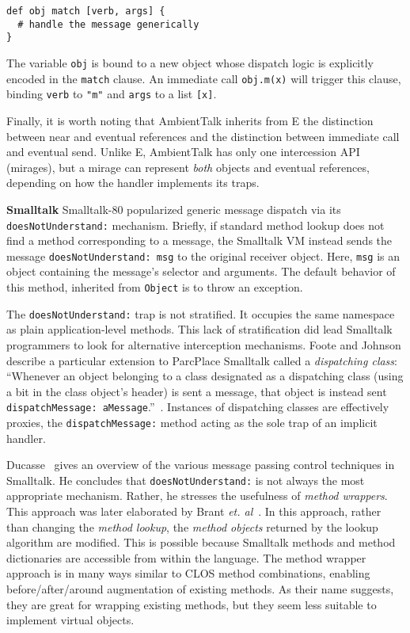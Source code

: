 \documentclass{acm_proc_article-sp}
\begin{document}
\begin{lstlisting}
def obj match [verb, args] {
  # handle the message generically
}
\end{lstlisting}

The variable \texttt{obj} is bound to a new object whose dispatch logic is explicitly encoded in the \texttt{match} clause. An immediate call \texttt{obj.m(x)} will trigger this clause, binding \texttt{verb} to \texttt{"m"} and \texttt{args} to a list \texttt{[x]}.

Finally, it is worth noting that AmbientTalk inherits from E the distinction between near and eventual references and the distinction between immediate call and eventual send. Unlike E, AmbientTalk has only one intercession API (mirages), but a mirage can represent \emph{both} objects and eventual references, depending on how the handler implements its traps.

\textbf{Smalltalk} Smalltalk-80 popularized generic message dispatch via its \texttt{doesNotUnderstand:} mechanism. Briefly, if standard method lookup does not find a method corresponding to a message, the Smalltalk VM instead sends the message \texttt{doesNotUnderstand: msg} to the original receiver object. Here, \texttt{msg} is an object containing the message's selector and arguments. The default behavior of this method, inherited from \texttt{Object} is to throw an exception.

The \texttt{doesNotUnderstand:} trap is not stratified. It occupies the same namespace as plain application-level methods. This lack of stratification did lead Smalltalk programmers to look for alternative interception mechanisms. Foote and Johnson describe a particular extension to ParcPlace Smalltalk called a \emph{dispatching class}: ``Whenever an object belonging to a class designated as a dispatching class (using a bit in the class object's header) is sent a message, that object is instead sent \texttt{dispatchMessage: aMessage}.''~\cite{foote_st80}. Instances of dispatching classes are effectively proxies, the \texttt{dispatchMessage:} method acting as the sole trap of an implicit handler.

Ducasse~\cite{ducasse99joop} gives an overview of the various message passing control techniques in Smalltalk. He concludes that \texttt{doesNotUnderstand:} is not always the most appropriate mechanism. Rather, he stresses the usefulness of \emph{method wrappers}. This approach was later elaborated by Brant \emph{et. al}~\cite{brant}. In this approach, rather than changing the \emph{method lookup}, the \emph{method objects} returned by the lookup algorithm are modified. This is possible because Smalltalk methods and method dictionaries are accessible from within the language. The method wrapper approach is in many ways similar to CLOS method combinations, enabling before/after/around augmentation of existing methods. As their name suggests, they are great for wrapping existing methods, but they seem less suitable to implement virtual objects.
\end{document}
